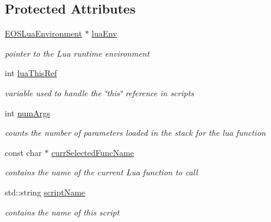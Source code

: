 \subsection*{Protected Attributes}
\begin{CompactItemize}
\item 
\hyperlink{classEOSLuaEnvironment}{EOSLuaEnvironment} $\ast$ \hyperlink{classEOSLuaScript_4417b00b43ee03bc2120f76a3bb12d07}{luaEnv}
\begin{CompactList}\small\item\em pointer to the Lua runtime environment \item\end{CompactList}\item 
int \hyperlink{classEOSLuaScript_6ce277b904132a14459a929d6d8a5903}{luaThisRef}
\begin{CompactList}\small\item\em variable used to handle the \char`\"{}this\char`\"{} reference in scripts \item\end{CompactList}\item 
int \hyperlink{classEOSLuaScript_b86282ecf112d657fd92b29b4e21a40e}{numArgs}
\begin{CompactList}\small\item\em counts the number of parameters loaded in the stack for the lua function \item\end{CompactList}\item 
const char $\ast$ \hyperlink{classEOSLuaScript_f4fddb1fd2af7b266cb7b41f6b50a047}{currSelectedFuncName}
\begin{CompactList}\small\item\em contains the name of the current Lua function to call \item\end{CompactList}\item 
std::string \hyperlink{classEOSLuaScript_7ca6cc5f26c5cfad510e9391e5815d8c}{scriptName}
\begin{CompactList}\small\item\em contains the name of this script \item\end{CompactList}\end{CompactItemize}
